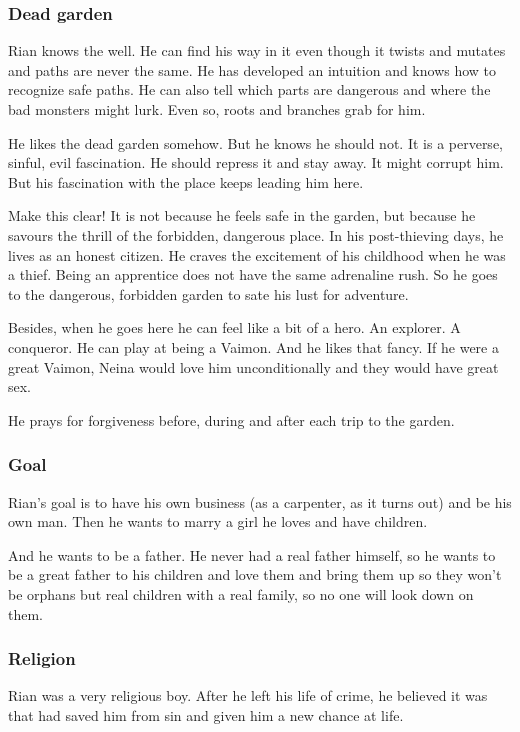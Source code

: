 \subsubsection{Dead garden}
Rian knows the  well.
He can find his way in it even though it twists and mutates and paths are never the same.
He has developed an intuition and knows how to recognize safe paths.
He can also tell which parts are dangerous and where the bad monsters might lurk.
Even so, roots and branches grab for him.

He likes the dead garden somehow.
But he knows he should not.
It is a perverse, sinful, evil fascination. 
He should repress it and stay away.
It might corrupt him. 
But his fascination with the place keeps leading him here. 

Make this clear!
It is not because he feels safe in the garden, but because he savours the thrill of the forbidden, dangerous place. 
In his post-thieving days, he lives as an honest citizen.
He craves the excitement of his childhood when he was a thief. 
Being an apprentice does not have the same adrenaline rush.
So he goes to the dangerous, forbidden garden to sate his lust for adventure.

Besides, when he goes here he can feel like a bit of a hero.
An explorer.
A conqueror.
He can play at being a Vaimon.
And he likes that fancy.
If he were a great Vaimon, Neina would love him unconditionally and they would have great sex. 

He prays for forgiveness before, during and after each trip to the garden. 





\subsubsection{Goal}
Rian's goal is to have his own business (as a carpenter, as it turns out) and be his own man. 
Then he wants to marry a girl he loves and have children. 

And he wants to be a father. 
He never had a real father himself, so he wants to be a great father to his children and love them and bring them up so they won't be orphans but real children with a real family, so no one will look down on them. 





\subsubsection{Religion}
Rian was a very religious boy. 
After he left his life of crime, he believed it was \iquin that had saved him from sin and given him a new chance at life. 

